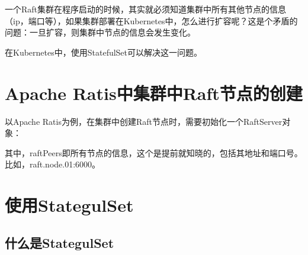 \documentclass[12pt]{article}
\begin{document}
\makeblogtitle

一个Raft集群在程序启动的时候，其实就必须知道集群中所有其他节点的信息（ip，端口等），如果集群部署在Kubernetes中，怎么进行扩容呢？这是个矛盾的问题：一旦扩容，则集群中节点的信息会发生变化。

在Kubernetes中，使用StatefulSet可以解决这一问题。

\section{Apache Ratis中集群中Raft节点的创建}\label{apache-ratisux4e2dux96c6ux7fa4ux4e2draftux8282ux70b9ux7684ux521bux5efa}

以Apache Ratis为例，在集群中创建Raft节点时，需要初始化一个RaftServer对象：

\begin{Shaded}
\begin{Highlighting}[]
\OperatorTok{=}\OperatorTok{(}\OperatorTok{(}\OperatorTok{(}\OperatorTok{)),}\OperatorTok{)}
\OperatorTok{=}\OperatorTok{()}
        \OperatorTok{(}\OperatorTok{)}
        \OperatorTok{(}\OperatorTok{)}
        \OperatorTok{(}\OperatorTok{)}
        \OperatorTok{(}\OperatorTok{)}
        \OperatorTok{()}
\end{Highlighting}
\end{Shaded}

其中，raftPeers即所有节点的信息，这个是提前就知晓的，包括其地址和端口号。比如，raft.node.01:6000。

\section{使用StategulSet}\label{ux4f7fux7528stategulset}

\subsection{什么是StategulSet}\label{ux4ec0ux4e48ux662fstategulset}
\end{document}
